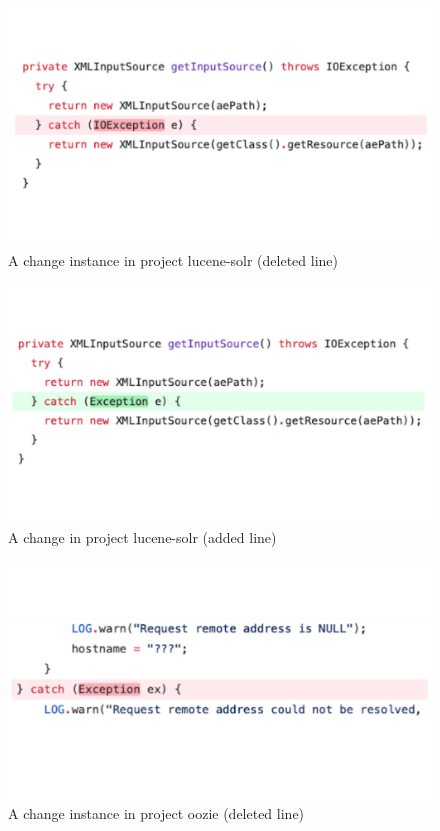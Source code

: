 \begin{figure}[!ht]
    \renewcommand{\arraystretch}{1}
    \centering
    \includegraphics[width=0.8\linewidth]{figures/string_1.pdf}\hfill
    \caption{A change instance in project lucene-solr (deleted line)}
    \label{fig:string_1}
\end{figure}

\begin{figure}[!ht]
    \renewcommand{\arraystretch}{1}
    \centering
    \includegraphics[width=0.8\linewidth]{figures/string_2.pdf}\hfill
    \caption{A change in project lucene-solr (added line)}
    \label{fig:string_2}
\end{figure}

\begin{figure}[!ht]
    \renewcommand{\arraystretch}{1}
    \centering
    \includegraphics[width=0.8\linewidth]{figures/string_3.pdf}\hfill
    \caption{A change instance in project oozie (deleted line)}
    \label{fig:string_3}
\end{figure}

